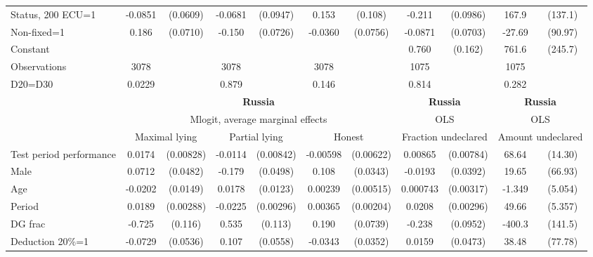 \begin{tabular}{l|cccccc|cc|cc}
Status, 200 ECU=1&  -0.0851         & (0.0609)&  -0.0681         & (0.0947)&    0.153         &  (0.108)&   -0.211\sym{**} & (0.0986)&    167.9         &  (137.1)\\
Non-fixed=1     &    0.186\sym{***}& (0.0710)&   -0.150\sym{**} & (0.0726)&  -0.0360         & (0.0756)&  -0.0871         & (0.0703)&   -27.69         &  (90.97)\\
Constant        &                  &         &                  &         &                  &         &    0.760\sym{***}&  (0.162)&    761.6\sym{***}&  (245.7)\\
\hline
Observations    &     3078         &         &     3078         &         &     3078         &         &     1075         &         &     1075         &         \\
D20=D30         &   0.0229         &         &    0.879         &         &    0.146         &         &    0.814         &         &    0.282         &         \\
\hline\hline
&\multicolumn{6}{c|}{\bf Russia}&\multicolumn{2}{c|}{\bf Russia}&\multicolumn{2}{c}{\bf Russia}\\ &\multicolumn{6}{c|}{Mlogit, average marginal effects }&\multicolumn{2}{c|}{OLS}&\multicolumn{2}{c}{OLS}\\
                &\multicolumn{2}{c}{Maximal lying}&\multicolumn{2}{c}{Partial lying}&\multicolumn{2}{c}{Honest}  &\multicolumn{2}{c}{Fraction undeclared}&\multicolumn{2}{c}{Amount undeclared}\\
\hline
Test period performance&   0.0174\sym{**} &(0.00828)&  -0.0114         &(0.00842)& -0.00598         &(0.00622)&  0.00865         &(0.00784)&    68.64\sym{***}&  (14.30)\\
Male            &   0.0712         & (0.0482)&   -0.179\sym{***}& (0.0498)&    0.108\sym{***}& (0.0343)&  -0.0193         & (0.0392)&    19.65         &  (66.93)\\
Age             &  -0.0202         & (0.0149)&   0.0178         & (0.0123)&  0.00239         &(0.00515)& 0.000743         &(0.00317)&   -1.349         &  (5.054)\\
Period          &   0.0189\sym{***}&(0.00288)&  -0.0225\sym{***}&(0.00296)&  0.00365\sym{*}  &(0.00204)&   0.0208\sym{***}&(0.00296)&    49.66\sym{***}&  (5.357)\\
DG frac         &   -0.725\sym{***}&  (0.116)&    0.535\sym{***}&  (0.113)&    0.190\sym{**} & (0.0739)&   -0.238\sym{**} & (0.0952)&   -400.3\sym{***}&  (141.5)\\
Deduction 20\%=1&  -0.0729         & (0.0536)&    0.107\sym{*}  & (0.0558)&  -0.0343         & (0.0352)&   0.0159         & (0.0473)&    38.48         &  (77.78)\\

\end{tabular}

